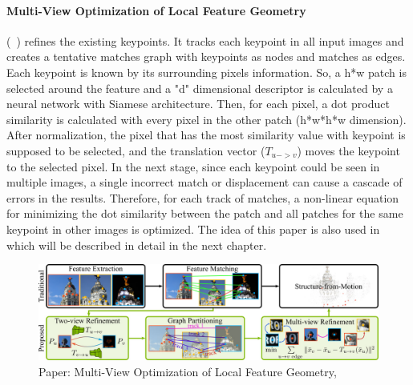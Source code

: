 \documentclass[11pt]{article}
\begin{document}
    \paragraph{Multi-View Optimization of Local Feature Geometry} (~\cite{Dusmanu2020Multi}) refines the existing keypoints. It tracks each keypoint in all input images and creates a tentative
    matches graph with keypoints as nodes and matches as edges. Each keypoint is known by its surrounding pixels
    information. So, a h*w patch is selected around the feature and a "d" dimensional descriptor is calculated by
    a neural network with Siamese architecture. Then, for each pixel, a dot product similarity is calculated
    with every pixel in the other patch (h*w*h*w dimension). After normalization, the pixel that has the most
    similarity value with keypoint is supposed to be selected, and the translation vector ($T_{u->v}$)
    moves the keypoint to the selected pixel. In the next stage, since each keypoint could be seen in multiple images,
    a single incorrect match or displacement can cause a cascade of errors in the results. Therefore, for each track of
    matches, a non-linear equation for minimizing the dot similarity between the patch and all patches for the same
    keypoint in other images is optimized. The idea of this paper is also used in \cite{lindenberger2021pixsfm} which will be
    described in detail in the next chapter.

    \begin{figure}
    \centering
    \includegraphics[width=\textwidth,height=\textheight,keepaspectratio]{images/dusmano.jpg}
    \caption{Paper: Multi-View Optimization of Local Feature Geometry, \cite{Dusmanu2020Multi}}
    \end{figure}
\end{document}
